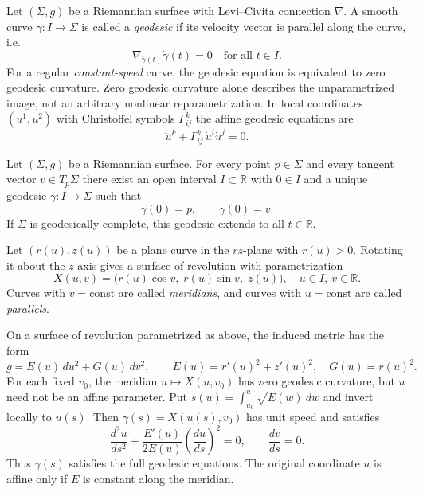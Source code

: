 \begin{solution}
	
	\begin{definition}[Geodesic]
		Let $(\Sigma,g)$ be a Riemannian surface with Levi--Civita connection
		$\nabla$. A smooth curve $\gamma:I\to\Sigma$ is called a \emph{geodesic} if
		its velocity vector is parallel along the curve, i.e.
		\[
		\nabla_{\dot\gamma(t)}\dot\gamma(t) = 0
		\quad\text{for all } t\in I.
		\]
		For a regular \emph{constant-speed} curve, the geodesic equation is
		equivalent to zero geodesic curvature.  Zero geodesic curvature
		alone describes the unparametrized image, not an arbitrary nonlinear
		reparametrization. In local coordinates $(u^1,u^2)$ with Christoffel
		symbols $\Gamma^k_{ij}$ the affine geodesic equations are
		\[
		\ddot u^k + \Gamma^{k}_{ij}\,\dot u^i \dot u^j = 0.
		\]
	\end{definition}
	
	\begin{theorem}
		Let $(\Sigma,g)$ be a Riemannian surface. For every point $p\in\Sigma$
		and every tangent vector $v\in T_p\Sigma$ there exist an open interval
		$I\subset\mathbb R$ with $0\in I$ and a unique geodesic
		$\gamma:I\to\Sigma$ such that
		\[
		\gamma(0)=p,\qquad \dot\gamma(0)=v.
		\]
		If $\Sigma$ is geodesically complete, this geodesic extends to all
		$t\in\mathbb R$.
	\end{theorem}
	
	\begin{definition}
		Let $(r(u),z(u))$ be a plane curve in the $rz$-plane with $r(u)>0$.
		Rotating it about the $z$-axis gives a surface of revolution with
		parametrization
		\[
		X(u,v) = \bigl(r(u)\cos v,\; r(u)\sin v,\; z(u)\bigr),
		\quad u\in I,\ v\in\mathbb R.
		\]
		Curves with $v=\mathrm{const}$ are called \emph{meridians}, and curves
		with $u=\mathrm{const}$ are called \emph{parallels}.
	\end{definition}
	
	\begin{proposition}
		On a surface of revolution parametrized as above, the induced metric has
		the form
		\[
		g = E(u)\,du^2 + G(u)\,dv^2, \qquad
		E(u) = r'(u)^2 + z'(u)^2,\quad G(u)=r(u)^2.
		\]
		For each fixed $v_0$, the meridian $u\mapsto X(u,v_0)$ has
		zero geodesic curvature, but $u$ need not be an affine parameter.
		Put $s(u)=\int_{u_0}^u\sqrt{E(w)}\,dw$ and invert locally to $u(s)$.
		Then $\gamma(s)=X(u(s),v_0)$ has unit speed and satisfies
		\[
		\frac{d^2u}{ds^2}+
		\frac{E'(u)}{2E(u)}\left(\frac{du}{ds}\right)^2=0,
		\qquad \frac{dv}{ds}=0.
		\]
		Thus $\gamma(s)$ satisfies the full geodesic equations.  The
		original coordinate $u$ is affine only if $E$ is constant along
		the meridian.
	\end{proposition}
	

\end{solution}
